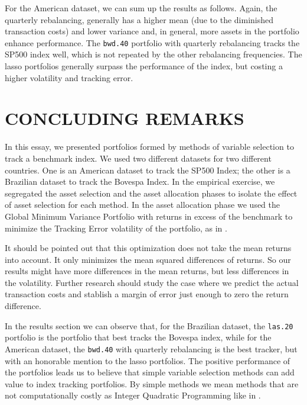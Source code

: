 \documentclass[12pt,oneside,a4paper]{memoir}
\begin{document}
For the American dataset, we can sum up the results as follows.
Again, the quarterly rebalancing, generally has a higher mean (due to the diminished transaction costs) and lower variance and, in general, more assets in the portfolio enhance performance. 
The \texttt{bwd.40} portfolio with quarterly rebalancing tracks the SP500 index well, which is not repeated by the other rebalancing frequencies.
The lasso portfolios generally surpass the performance of the index, but costing a higher volatility and tracking error.

\section{CONCLUDING REMARKS} \label{sec:conc}

In this essay, we presented portfolios formed by methods of variable selection to track a benchmark index.
We used two different datasets for two different countries.
One is an American dataset to track the SP500 Index; the other is a Brazilian dataset to track the Bovespa Index.
In the empirical exercise, we segregated the asset selection and the asset allocation phases to isolate the effect of asset selection for each method.
In the asset allocation phase we used the Global Minimum Variance Portfolio with returns in excess of the benchmark to minimize the Tracking Error volatility of the portfolio, as in .

It should be pointed out that this optimization does not take the mean returns into account. 
It only minimizes the mean squared differences of returns.
So our results might have more differences in the mean returns, but less differences in the volatility.
Further research should study the case where we predict the actual transaction costs and stablish a margin of error just enough to zero the return difference.

In the results section we can observe that, for the Brazilian dataset, the \texttt{las.20} portfolio is the portfolio that best tracks the Bovespa index, while for the American dataset, the \texttt{bwd.40} with quarterly rebalancing is the best tracker, but with an honorable mention to the lasso portfolios.
The positive performance of the portfolios leads us to believe that simple variable selection methods can add value to index tracking portfolios.
By simple methods we mean methods that are not computationally costly as Integer Quadratic Programming like in .
\end{document}
